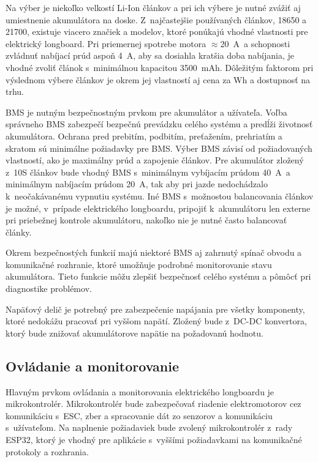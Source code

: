 Na výber je niekoľko velkostí Li-Ion článkov a pri ich výbere je nutné zvážiť aj umiestnenie akumulátora na doske. 
Z~najčastejšie používaných článkov, 18650 a 21700, existuje viacero značiek a modelov, ktoré ponúkajú vhodné vlastnosti pre elektrický longboard.\cite{BatterySpaceTypes}
Pri priemernej spotrebe motora $\approx$20~A~a schopnosti zvládnuť nabíjací prúd aspoň 4~A, aby sa dosiahla kratšia doba nabíjania, je vhodné zvoliť článok s~minimálnou kapacitou 3500~mAh.
Dôležitým faktorom pri výslednom výbere článkov je okrem jej vlastností aj cena za Wh a dostupnosť na trhu.

\bigskip

BMS je nutným bezpečnostným prvkom pre akumulátor a užívateľa.
Voľba správneho BMS zabezpečí bezpečnú prevádzku celého systému a predĺži životnosť akumulátora.
Ochrana pred prebitím, podbitím, preťažením, prehriatím a skratom sú minimálne požiadavky pre BMS.
Výber BMS závisí od požiadovaných vlastností, ako je maximálny prúd a zapojenie článkov.
Pre akumulátor zložený z~10S článkov bude vhodný BMS s~minimálnym vybíjacím prúdom 40~A~a minimálnym nabíjacím prúdom 20~A, tak aby pri jazde nedochádzalo k~neočakávanému vypnutiu systému.
Iné BMS s~možnostou balancovania článkov je možné, v~prípade elektrického longboardu, pripojiť k~akumulátoru len externe pri priebežnej kontrole akumulátoru, nakoľko nie je nutné často balancovať články.

Okrem bezpečnostých funkcií majú niektoré BMS aj zahrnutý spínač obvodu a komunikačné rozhranie, ktoré umožňuje podrobné monitorovanie stavu akumulátora.
Tieto funkcie môžu zlepšiť bezpečnosť celého systému a pômôcť pri diagnostike problémov.

\bigskip

Napäťový delič je potrebný pre zabezpečenie napájania pre všetky komponenty, ktoré nedokážu pracovať pri vyššom napätí.
Zložený bude z~DC-DC konvertora, ktorý bude znižovať akumulátorove napätie na požadovanú hodnotu. 

\subsection{Ovládanie a monitorovanie}

Hlavným prvkom ovládania a monitorovania elektrického longboardu je mikrokontrolér.
Mikrokontrolér bude zabezpečovať riadenie elektromotorov cez komunikáciu s~ESC, zber a spracovanie dát zo senzorov a komunikáciu s~užívateľom.
Na naplnenie požiadaviek bude zvolený mikrokontrolér z~rady ESP32, ktorý je vhodný pre aplikácie s~vyššími požiadavkami na komunikačné protokoly a rozhrania.

